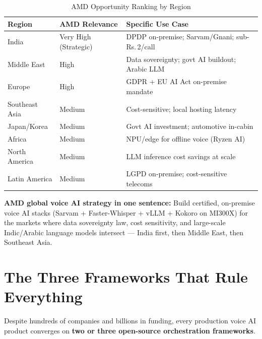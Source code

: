 \documentclass[12pt,a4paper]{article}
\begin{document}
\begin{table}[H]\centering
\caption{AMD Opportunity Ranking by Region}
\label{tab:amd-geo}
\begin{tabularx}{\textwidth}{llX}
\toprule
\textbf{Region} & \textbf{AMD Relevance} & \textbf{Specific Use Case} \\
\midrule
India          & Very High (Strategic)   & DPDP on-premise; Sarvam/Gnani; sub-Rs.\,2/call \\
Middle East    & High                    & Data sovereignty; govt AI buildout; Arabic LLM \\
Europe         & High                    & GDPR + EU AI Act on-premise mandate \\
Southeast Asia & Medium                  & Cost-sensitive; local hosting latency \\
Japan/Korea    & Medium                  & Govt AI investment; automotive in-cabin \\
Africa         & Medium                  & NPU/edge for offline voice (Ryzen AI) \\
North America  & Medium                  & LLM inference cost savings at scale \\
Latin America  & Medium                  & LGPD on-premise; cost-sensitive telecoms \\
\bottomrule
\end{tabularx}
\end{table}

\textbf{AMD global voice AI strategy in one sentence:} Build certified,
on-premise voice AI stacks (Sarvam + Faster-Whisper + vLLM + Kokoro on
MI300X) for the markets where data sovereignty law, cost sensitivity, and
large-scale Indic/Arabic language models intersect --- India first, then
Middle East, then Southeast Asia.

\section{The Three Frameworks That Rule Everything}
\label{sec:frameworks}

Despite hundreds of companies and billions in funding, every production
voice AI product converges on \textbf{two or three open-source orchestration
frameworks}.
\end{document}
